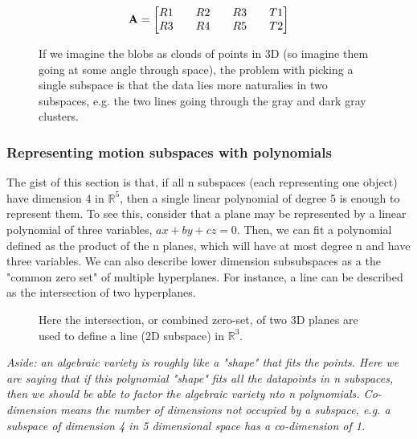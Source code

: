 \documentclass[a4paper]{article}
\begin{document}
{\begin{equation} {\bf A} = \begin{bmatrix} R1 && R2 && R3 && T1 \\ R3 && R4 && R5 && T2 \\ \end{bmatrix} \end{equation}

 \begin{figure} \centering
     \caption{If we imagine the blobs as clouds of points in 3D (so imagine them going at some angle through space), the  problem with picking a
 single subspace is that the data lies more naturalies in two subspaces, e.g. the two lines going through the gray and dark gray clusters.}
 \end{figure}

\subsubsection{Representing motion subspaces with polynomials}

 The gist of this section is that, if all n subspaces (each representing one object) have dimension 4 in $\mathbb{R}^5$, then a single linear
 polynomial of degree 5 is enough to represent them. To see this, consider that a plane may be represented by a linear polynomial of three variables,
 $ax+by+cz = 0$. Then, we can fit a polynomial defined as the product of the n planes, which will have at most degree n and have three variables. We
 can also describe lower dimension subsubspaces as a the "common zero set" of multiple hyperplanes. For instance, a line can be described as the
 intersection of two hyperplanes. 

 \begin{figure} \centering
     \caption{Here the intersection, or combined zero-set, of two 3D planes are used to define a line (2D subspace) in $\mathbb{R}^3$.} \end{figure}

 \textit{Aside: an algebraic variety is roughly like a "shape" that fits the points. Here we are saying that if this polynomial "shape" fits all the
 datapoints in n subspaces, then we should be able to factor the algebraic variety nto n polynomials.  Co-dimension means the number of dimensions not
 occupied by a subspace, e.g. a subspace of dimension 4 in 5 dimensional space has a co-dimension of 1. }
}
\end{document}

